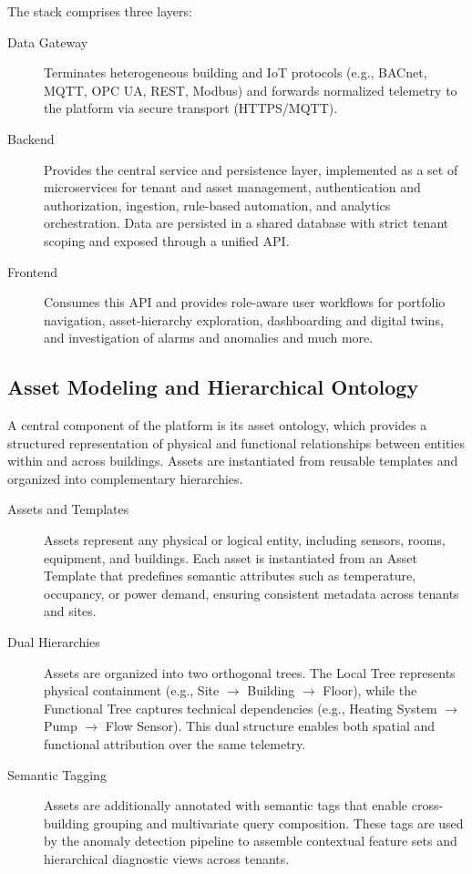 The stack comprises three layers:
\begin{description}
	\item[Data Gateway]
	Terminates heterogeneous building and IoT protocols (e.g., BACnet, MQTT, OPC UA, REST, Modbus) and forwards normalized telemetry to the platform via secure transport (HTTPS/MQTT).

	\item[Backend]
	Provides the central service and persistence layer, implemented as a set of microservices for tenant and asset management, authentication and authorization, ingestion, rule-based automation, and analytics orchestration\parencite{ElionaRuleChains,ElionaRules}. Data are persisted in a shared database with strict tenant scoping and exposed through a unified API.

	\item[Frontend]
	Consumes this API and provides role-aware user workflows for portfolio navigation, asset-hierarchy exploration, dashboarding and digital twins, and investigation of alarms and anomalies and much more.
\end{description}

\subsection{Asset Modeling and Hierarchical Ontology}

A central component of the platform is its asset ontology, which provides a structured
representation of physical and functional relationships between entities within and
across buildings\parencite{ElionaOntologies,ElionaAssetModelingTemplates}. Assets are
instantiated from reusable templates and organized into complementary hierarchies.

\begin{description}
    \item[Assets and Templates]
    Assets represent any physical or logical entity, including sensors, rooms,
    equipment, and buildings. Each asset is instantiated from an Asset Template that
    predefines semantic attributes such as temperature, occupancy, or power demand,
    ensuring consistent metadata across tenants and sites.

    \item[Dual Hierarchies]
    Assets are organized into two orthogonal trees. The {Local Tree} represents
    physical containment (e.g., Site $\rightarrow$ Building $\rightarrow$ Floor),
    while the {Functional Tree} captures technical dependencies (e.g., Heating
    System $\rightarrow$ Pump $\rightarrow$ Flow Sensor). This dual structure enables
    both spatial and functional attribution over the same telemetry.

    \item[Semantic Tagging]
    Assets are additionally annotated with semantic tags that enable cross-building
    grouping and multivariate query composition. These tags are used by the anomaly
    detection pipeline to assemble contextual feature sets and hierarchical diagnostic
    views across tenants.
\end{description}


